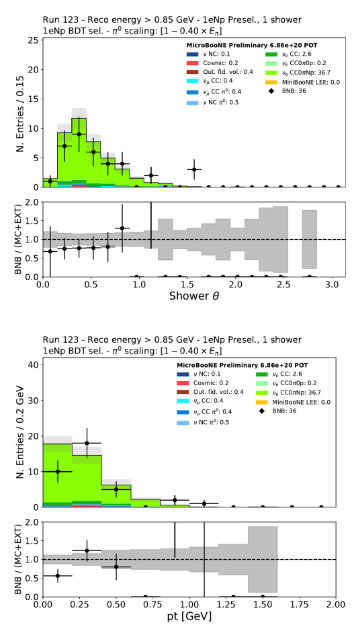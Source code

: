 \begin{figure}[H]
    \centering
    \begin{subfigure}{0.3\textwidth}
    \includegraphics[width=1.0\textwidth]{Sidebands/Figures/1eNp/HighEnergy/HiEext_NPOneShr_NPBDT_pi0e040/shr_theta.pdf}
    \caption{}
    \end{subfigure}
    \begin{subfigure}{0.3\textwidth}
    \includegraphics[width=1.0\textwidth]{Sidebands/Figures/1eNp/HighEnergy/HiEext_NPOneShr_NPBDT_pi0e040/pt.pdf}

\end{subfigure}
\end{figure}

